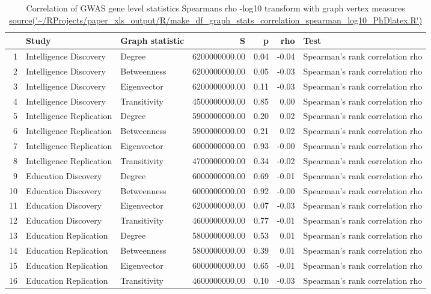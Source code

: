 \begin{table}[ht]
\centering
  \begin{adjustbox}{max width=\textwidth}
\begin{tabular}{rllrrrl}
  \hline
 & Study & Graph statistic & S & p & rho & Test \\ 
  \hline
1 & Intelligence Discovery & Degree & 6200000000.00 & 0.04 & -0.04 & Spearman's rank correlation rho \\ 
  2 & Intelligence Discovery & Betweenness & 6200000000.00 & 0.05 & -0.03 & Spearman's rank correlation rho \\ 
  3 & Intelligence Discovery & Eigenvector & 6200000000.00 & 0.11 & -0.03 & Spearman's rank correlation rho \\ 
  4 & Intelligence Discovery & Transitivity & 4500000000.00 & 0.85 & 0.00 & Spearman's rank correlation rho \\ 
  5 & Intelligence Replication & Degree & 5900000000.00 & 0.20 & 0.02 & Spearman's rank correlation rho \\ 
  6 & Intelligence Replication & Betweenness & 5900000000.00 & 0.21 & 0.02 & Spearman's rank correlation rho \\ 
  7 & Intelligence Replication & Eigenvector & 6000000000.00 & 0.93 & -0.00 & Spearman's rank correlation rho \\ 
  8 & Intelligence Replication & Transitivity & 4700000000.00 & 0.34 & -0.02 & Spearman's rank correlation rho \\ 
  9 & Education Discovery & Degree & 6000000000.00 & 0.69 & -0.01 & Spearman's rank correlation rho \\ 
  10 & Education Discovery & Betweenness & 6000000000.00 & 0.92 & -0.00 & Spearman's rank correlation rho \\ 
  11 & Education Discovery & Eigenvector & 6200000000.00 & 0.07 & -0.03 & Spearman's rank correlation rho \\ 
  12 & Education Discovery & Transitivity & 4600000000.00 & 0.77 & -0.01 & Spearman's rank correlation rho \\ 
  13 & Education Replication & Degree & 5800000000.00 & 0.53 & 0.01 & Spearman's rank correlation rho \\ 
  14 & Education Replication & Betweenness & 5800000000.00 & 0.39 & 0.01 & Spearman's rank correlation rho \\ 
  15 & Education Replication & Eigenvector & 6000000000.00 & 0.65 & -0.01 & Spearman's rank correlation rho \\ 
  16 & Education Replication & Transitivity & 4600000000.00 & 0.10 & -0.03 & Spearman's rank correlation rho \\ 
   \hline
\end{tabular}
\end{adjustbox}
\caption{Correlation of GWAS gene level statistics Spearmans rho -log10 transform with graph vertex measures \url{source('~/RProjects/paper_xls_output/R/make_df_graph_stats_correlation_spearman_log10_PhDlatex.R')}} 
\label{Table:Correlation of GWAS gene level statistics Spearmans rho -log10 transform with graph vertex measures}
\end{table}

